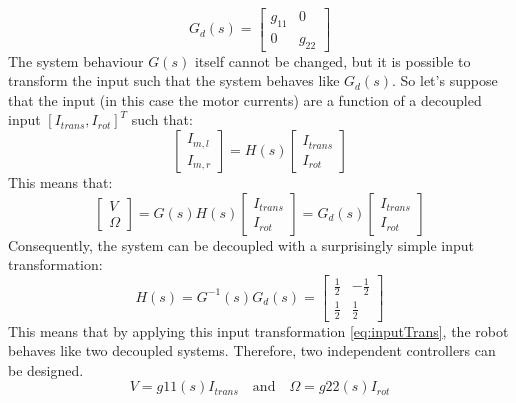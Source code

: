\documentclass[a4paper, 11pt]{article}
\begin{document}
\begin{equation}
	G_d(s) = 
	\begin{bmatrix}
	g_{11} & 0 \\
	0 & g_{22}
	\end{bmatrix}
\end{equation}
The system behaviour $G(s)$ itself cannot be changed, but it is possible to transform the input such that the system behaves like $G_d(s)$. So let's suppose that the input (in this case the motor currents) are a function of a decoupled input $[I_{trans}, I_{rot}]^T$ such that:
\begin{equation}
	\begin{bmatrix}
	I_{m,l} \\ I_{m,r}
	\end{bmatrix}
	= H(s)
	\begin{bmatrix}
	I_{trans} \\ I_{rot}
	\end{bmatrix}
	\label{eq:inputTrans}
\end{equation}
This means that:
\begin{equation}
	\begin{bmatrix}
	V\\ \Omega
	\end{bmatrix}
	= G(s)H(s)
	\begin{bmatrix}
	I_{trans}\\ I_{rot}
	\end{bmatrix}
	= G_d(s)
	\begin{bmatrix}
	I_{trans}\\ I_{rot}
	\end{bmatrix}
\end{equation}
Consequently, the system can be decoupled with a surprisingly simple input transformation:
\begin{equation}
	H(s) = G^{-1}(s)G_d(s) = 
	\begin{bmatrix}
	\frac{1}{2} & -\frac{1}{2}\\[6pt]
	\frac{1}{2} & \frac{1}{2}
	\end{bmatrix}
\end{equation}
This means that by applying this input transformation \eqref{eq:inputTrans}, the robot behaves like two decoupled systems. Therefore, two independent controllers can be designed.
\begin{equation}
	V = g{11}(s)I_{trans} \quad \textrm{and} \quad \Omega = g{22}(s)I_{rot}
\end{equation}

\end{document}
